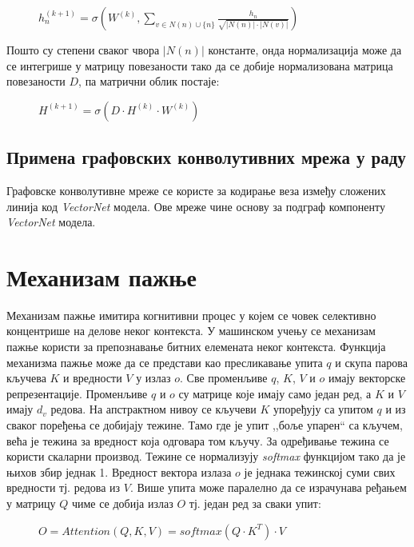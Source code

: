\documentclass[11pt,oneside]{memoir}
\begin{document}
\begin{figure}[H]
  \centering
  $h^{(k+1)}_n = \sigma (W^{(k)}, \sum_{v \in N(n) \cup \{n\}} \frac{h_n}{\sqrt{|N(n)|\cdot |N(v)|}})$
\end{figure}

Пошто су степени сваког чвора $|N(n)|$ константе, онда нормализација може да се интегрише у матрицу повезаности тако да се добије
нормализована матрица повезаности $D$, па матрични облик постаје:

\begin{figure}[H]
  \centering
  $H^{(k+1)} = \sigma (D\cdot H^{(k)}\cdot W^{(k)})$
\end{figure}

\subsection{Примена графовских конволутивних мрежа у раду}

Графовске конволутивне мреже се користе за кодирање веза између сложених линија код \textit{VectorNet} \cite{vectornet} модела. Ове мреже
чине основу за подграф компоненту \textit{VectorNet} модела.

\section{Механизам пажње}

Механизам пажње имитира когнитивни процес у којем се човек селективно концентрише на делове неког контекста. У машинском учењу
се механизам пажње користи за препознавање битних елемената неког контекста. Функција механизма пажње може да се
представи као пресликавање упита $q$ и скупа парова кључева $K$ и вредности $V$ у излаз $o$. Све променљиве $q$, $K$, $V$ и $o$ имају
векторске репрезентације.
Променљиве $q$ и $o$ су матрице које имају само један ред, а $K$ и $V$ имају $d_v$ редова.
На апстрактном нивоу се кључеви $K$ упоређују са упитом $q$ и из сваког поређења се добијају тежине. Тамо где је упит ,,боље упарен`` са кључем,
већа је тежина за вредност која одговара том кључу. За одређивање тежина се користи скаларни производ. 
Тежине се нормализују \textit{softmax} функцијом тако да је њихов збир једнак 1.
Вредност вектора излаза $o$ је једнака тежинској суми свих вредности тј. редова из $V$. Више упита може паралелно да се израчунава ређањем
у матрицу $Q$ чиме се добија излаз $O$ тј. један ред за сваки упит:

\begin{figure}[H]
  \centering
  $O = Attention(Q, K, V) = softmax(Q\cdot K^T)\cdot V$
\end{figure}
\end{document}
